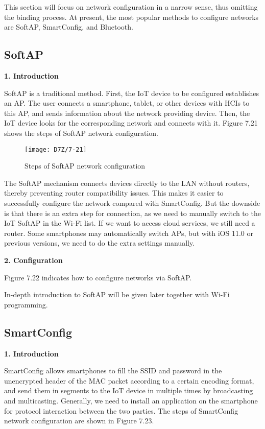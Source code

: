 \documentclass[a4paper,12pt]{book}
\begin{document}
This section will focus on network configuration in a narrow sense, thus omitting the binding process. At present, the most popular methods to configure networks are SoftAP, SmartConfig, and Bluetooth.

\subsection{SoftAP}
\textbf{1. Introduction}

SoftAP is a traditional method. First, the IoT device to be configured establishes an AP. The user connects a smartphone, tablet, or other devices with HCIs to this AP, and sends information about the network providing device. Then, the IoT device looks for the corresponding network and connects with it. Figure 7.21 shows the steps of SoftAP network configuration.

\begin{figure}[!h]
    \centering
    \texttt{[image: D7Z/7-21]}
    \caption{Steps of SoftAP network configuration}
\end{figure}

The SoftAP mechanism connects devices directly to the LAN without routers, thereby preventing router compatibility issues. This makes it easier to successfully configure the network compared with SmartConfig. But the downside is that there is an extra step for connection, as we need to manually switch to the IoT SoftAP in the Wi-Fi list. If we want to access cloud services, we still need a router. Some smartphones may automatically switch APs, but with iOS 11.0 or previous versions, we need to do the extra settings manually.

\textbf{2. Configuration}

Figure 7.22 indicates how to configure networks via SoftAP.

In-depth introduction to SoftAP will be given later together with Wi-Fi programming.

\subsection{SmartConfig}
\textbf{1. Introduction}

SmartConfig allows smartphones to fill the SSID and password in the unencrypted header of the MAC packet according to a certain encoding format, and send them in segments to the IoT device in multiple times by broadcasting and multicasting. Generally, we need to install an application on the smartphone for protocol interaction between the two parties. The steps of SmartConfig network configuration are shown in Figure 7.23.
\end{document}
